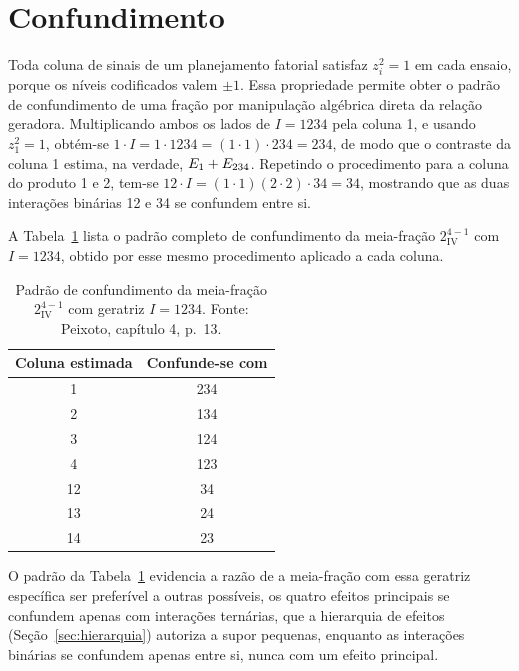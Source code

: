\documentclass{doeapostila}
\begin{document}
\section{Confundimento}
\label{sec:confundimento}

Toda coluna de sinais de um planejamento fatorial satisfaz $z_{i}^{2} = 1$
em cada ensaio, porque os níveis codificados valem $\pm 1$. Essa propriedade
permite obter o padrão de confundimento de uma fração por manipulação
algébrica direta da relação geradora. Multiplicando ambos os lados de
$I = 1234$ pela coluna 1, e usando $z_{1}^{2} = 1$, obtém-se
$1 \cdot I = 1 \cdot 1234 = (1 \cdot 1) \cdot 234 = 234$, de modo que o
contraste da coluna 1 estima, na verdade, $E_{1} + E_{234}$.
Repetindo o procedimento para a coluna do produto 1 e 2, tem-se
$12 \cdot I = (1 \cdot 1)(2 \cdot 2) \cdot 34 = 34$, mostrando que as duas
interações binárias 12 e 34 se confundem entre si.

A Tabela~\ref{tab:confundimento} lista o padrão completo de confundimento da
meia-fração $2^{4-1}_{\mathrm{IV}}$ com $I = 1234$, obtido por esse mesmo
procedimento aplicado a cada coluna.

\begin{table}[H]
  \centering
  \caption{Padrão de confundimento da meia-fração $2^{4-1}_{\mathrm{IV}}$ com
    geratriz $I = 1234$. Fonte: Peixoto, capítulo 4, p.~13.}
  \label{tab:confundimento}
  \begin{tabular}{c c}
    \toprule
    Coluna estimada & Confunde-se com \\
    \midrule
    1  & 234 \\
    2  & 134 \\
    3  & 124 \\
    4  & 123 \\
    12 & 34  \\
    13 & 24  \\
    14 & 23  \\
    \bottomrule
  \end{tabular}
\end{table}

O padrão da Tabela~\ref{tab:confundimento} evidencia a razão de a meia-fração
com essa geratriz específica ser preferível a outras possíveis, os quatro
efeitos principais se confundem apenas com interações ternárias, que a
hierarquia de efeitos (Seção~\ref{sec:hierarquia}) autoriza a supor pequenas,
enquanto as interações binárias se confundem apenas entre si, nunca com um
efeito principal.
\end{document}
